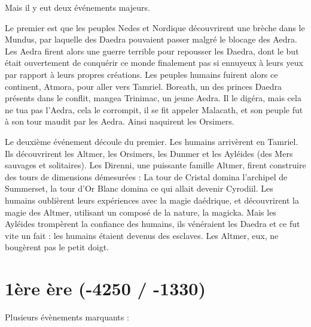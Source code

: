 Mais il y eut deux événements majeurs.

Le premier est que les peuples Nedes et Nordique découvrirent une brèche dans le Mundus, par laquelle des Daedra pouvaient passer malgré le blocage des Aedra. Les Aedra firent alors une guerre terrible pour repousser les Daedra, dont le but était ouvertement de conquérir ce monde finalement pas si ennuyeux à leurs yeux par rapport à leurs propres créations. Les peuples humains fuirent alors ce continent, Atmora, pour aller vers Tamriel. Boreath, un des princes Daedra présents dans le conflit, mangea Trinimac, un jeune Aedra. Il le digéra, mais cela ne tua pas l'Aedra, cela le corrompit, il se fit appeler Malacath, et son peuple fut à son tour maudit par les Aedra. Ainsi naquirent les Orsimers.

Le deuxième événement découle du premier. Les humains arrivèrent en Tamriel. Ils découvrirent les Altmer, les Orsimers, les Dunmer et les Ayléides (des Mers sauvages et solitaires). Les Direnni, une puissante famille Altmer, firent construire des tours de dimensions démesurées : La tour de Cristal domina l'archipel de Summerset, la tour d'Or Blanc domina ce qui allait devenir Cyrodiil. Les humains oublièrent leurs expériences avec la magie daédrique, et découvrirent la magie des Altmer, utilisant un composé de la nature, la magicka. Mais les Ayléides trompèrent la confiance des humains, ils vénéraient les Daedra et ce fut vite un fait : les humains étaient devenus des esclaves. Les Altmer, eux, ne bougèrent pas le petit doigt.

\section{1ère ère (-4250 / -1330)}

Plusieurs évènements marquants :

